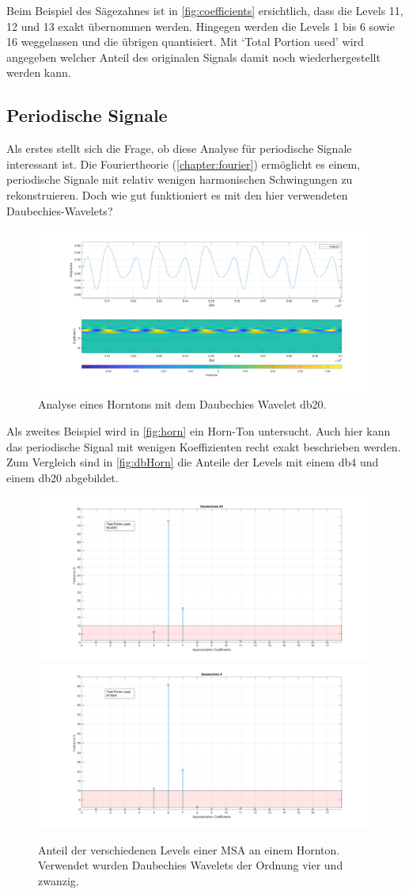 \begin{refsection}
Beim Beispiel des Sägezahnes ist in \autoref{fig:coefficients} ersichtlich, dass die Levels 11, 12 und 13 exakt übernommen werden.
Hingegen werden die Levels 1 bis 6 sowie 16 weggelassen und die übrigen quantisiert.
Mit `Total Portion used' wird angegeben welcher Anteil des originalen Signals damit noch wiederhergestellt werden kann.

\subsection{Periodische Signale}
Als erstes stellt sich die Frage, ob diese Analyse für periodische Signale interessant ist.
Die Fouriertheorie (\autoref{chapter:fourier}) ermöglicht es einem, periodische Signale mit relativ wenigen harmonischen Schwingungen zu rekonstruieren.
Doch wie gut funktioniert es mit den hier verwendeten Daubechies-Wavelets?

\begin{figure}
	\centering
	\includegraphics[width=\linewidth]{papers/compress/Bilder/frenchHorn_normal.pdf}
	\caption{Analyse eines Horntons mit dem Daubechies Wavelet db20.}
	\label{fig:horn}
\end{figure}

Als zweites Beispiel wird in \autoref{fig:horn} ein Horn-Ton untersucht.
Auch hier kann das periodische Signal mit wenigen Koeffizienten recht exakt beschrieben werden. 
Zum Vergleich sind in \autoref{fig:dbHorn} die Anteile der Levels mit einem db4 und einem db20 abgebildet.
\begin{figure}
	\includegraphics[width=0.5\linewidth]{papers/compress/Bilder/frenchHorn_db20.pdf}
	\includegraphics[width=0.5\linewidth]{papers/compress/Bilder/frenchHorn_db4.pdf}
	\caption{Anteil der verschiedenen Levels einer MSA an einem Hornton. Verwendet wurden Daubechies Wavelets der Ordnung vier und zwanzig.}
	\label{fig:dbHorn}
\end{figure}


\end{refsection}
